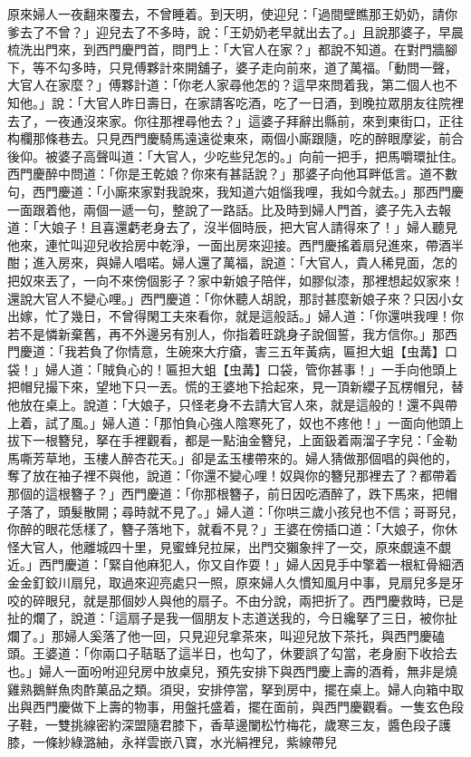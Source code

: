 \begin{showcontents}{}
原來婦人一夜翻來覆去，不曾睡着。到天明，使迎兒：「過間壁瞧那王奶奶，請你爹去了不曾？」迎兒去了不多時，說：「王奶奶老早就出去了。」且說那婆子，早晨梳洗出門來，到西門慶門首，問門上：「大官人在家？」都說不知道。在對門牆腳下，等不勾多時，只見傅夥計來開舖子，婆子走向前來，道了萬福。「動問一聲，大官人在家麼？」傅夥計道：「你老人家尋他怎的？這早來問着我，第二個人也不知他。」說：「大官人昨日壽日，在家請客吃酒，吃了一日酒，到晚拉眾朋友往院裡去了，一夜通沒來家。你往那裡尋他去？」這婆子拜辭出縣前，來到東街口，正往构欄那條巷去。只見西門慶騎馬遠遠從東來，兩個小廝跟隨，吃的醉眼摩娑，前合後仰。被婆子高聲叫道：「大官人，少吃些兒怎的。」向前一把手，把馬嚼環扯住。西門慶醉中問道：「你是王乾娘？你來有甚話說？」那婆子向他耳畔低言。道不數句，西門慶道：「小廝來家對我說來，我知道六姐惱我哩，我如今就去。」那西門慶一面跟着他，兩個一遞一句，整說了一路話。比及時到婦人門首，婆子先入去報道：「大娘子！且喜還虧老身去了，沒半個時辰，把大官人請得來了！」婦人聽見他來，連忙叫迎兒收拾房中乾淨，一面出房來迎接。西門慶搖着扇兒進來，帶酒半酣；進入房來，與婦人唱喏。婦人還了萬福，說道：「大官人，貴人稀見面，怎的把奴來丟了，一向不來傍個影子？家中新娘子陪伴，如膠似漆，那裡想起奴家來！還說大官人不變心哩。」西門慶道：「你休聽人胡說，那討甚麼新娘子來？只因小女出嫁，忙了幾日，不曾得閑工夫來看你，就是這般話。」婦人道：「你還哄我哩！你若不是憐新棄舊，再不外邊另有別人，你指着旺跳身子說個誓，我方信你。」那西門慶道：「我若負了你情意，生碗來大疔瘡，害三五年黃病，匾担大蛆【虫冓】口袋！」婦人道：「賊負心的！匾担大蛆【虫冓】口袋，管你甚事！」一手向他頭上把帽兒撮下來，望地下只一丟。慌的王婆地下拾起來，見一頂新纓子瓦楞帽兒，替他放在桌上。說道：「大娘子，只怪老身不去請大官人來，就是這般的！還不與帶上着，試了風。」婦人道：「那怕負心強人陰寒死了，奴也不疼他！」一面向他頭上拔下一根簪兒，拏在手裡觀看，都是一點油金簪兒，上面鈒着兩溜子字兒：「金勒馬嘶芳草地，玉樓人醉杏花天。」卻是孟玉樓帶來的。婦人猜做那個唱的與他的，奪了放在袖子裡不與他，說道：「你還不變心哩！奴與你的簪兒那裡去了？都帶着那個的這根簪子？」西門慶道：「你那根簪子，前日因吃酒醉了，跌下馬來，把帽子落了，頭髮散開；尋時就不見了。」婦人道：「你哄三歲小孩兒也不信；哥哥兒，你醉的眼花恁樣了，簪子落地下，就看不見？」王婆在傍插口道：「大娘子，你休怪大官人，他離城四十里，見蜜蜂兒拉屎，出門交獺象拌了一交，原來覷遠不覷近。」西門慶道：「緊自他麻犯人，你又自作耍！」婦人因見手中擎着一根紅骨細洒金金釘鉸川扇兒，取過來迎亮處只一照，原來婦人久慣知風月中事，見扇兒多是牙咬的碎眼兒，就是那個妙人與他的扇子。不由分說，兩把折了。西門慶救時，已是扯的爛了，說道：「這扇子是我一個朋友卜志道送我的，今日纔拏了三日，被你扯爛了。」那婦人奚落了他一回，只見迎兒拿茶來，叫迎兒放下茶托，與西門慶磕頭。王婆道：「你兩口子聐聒了這半日，也勾了，休要誤了勾當，老身廚下收拾去也。」婦人一面吩咐迎兒房中放桌兒，預先安排下與西門慶上壽的酒肴，無非是燒雞熟鵝鮮魚肉酢菓品之類。須臾，安排停當，拏到房中，擺在桌上。婦人向箱中取出與西門慶做下上壽的物事，用盤托盛着，擺在面前，與西門慶觀看。一隻玄色段子鞋，一雙挑線密約深盟隨君膝下，香草邊闌松竹梅花，歲寒三友，醬色段子護膝，一條紗綠潞紬，永祥雲嵌八寶，水光絹裡兒，紫線帶兒
\end{showcontents}
